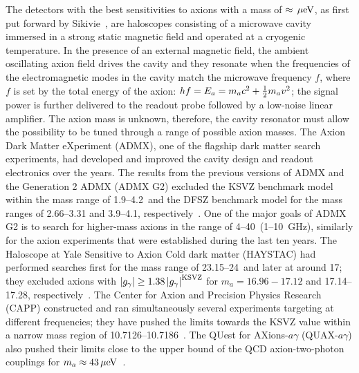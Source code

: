 The detectors with the best sensitivities to axions with a mass of 
$\approx \,\mu\text{e\hspace{-.08em}V}$, as first put forward by 
Sikivie~\cite{SikivieI,SikivieII},  
are haloscopes consisting of a microwave cavity immersed in a strong static 
magnetic field and operated at a cryogenic temperature. 
In the presence of an external magnetic field, the ambient oscillating axion 
field drives the cavity and they resonate when the frequencies of the 
electromagnetic 
modes in the cavity match the microwave frequency $f$, where $f$ is set by 
the total energy of the axion: $hf=E_a=m_a c^2 + \frac{1}{2}m_a v^2$; the 
signal power is further delivered %
to the readout probe followed by a low-noise linear amplifier. 
The axion mass is unknown, therefore, 
the cavity resonator must allow the possibility to be tuned through a range
of possible axion masses. The Axion Dark Matter eXperiment (ADMX), 
one of the flagship dark matter search experiments, had developed and 
improved the cavity design and readout electronics over the years. 
The results from the previous 
versions of ADMX and the Generation 2 ADMX (ADMX G2) excluded the KSVZ 
benchmark model within the mass range of %
1.9--4.2\muevcc\ and the DFSZ benchmark model for the mass ranges 
of 2.66--3.31 and 3.9--4.1\muevcc, 
respectively~\cite{ADMXI,ADMXII,ADMXIII,ADMXIV,ADMXV,ADMXVI,ADMXVII}. 
One of the major goals of ADMX G2 is to search for higher-mass axions in the range 
of 4--40\muevcc\ (1--10~GHz), similarly for the axion experiments that 
were established during the last ten years.  
The Haloscope at Yale Sensitive to Axion Cold dark matter 
(HAYSTAC) had performed searches first for the mass range of 
23.15--24\muevcc\ and later at around 17\muevcc; they excluded axions 
with $\left|g_{\gamma}\right|\geq 1.38 \left|g_{\gamma}\right|^\text{KSVZ}$ for $m_a=16.96-17.12$ and 
17.14--17.28\muevcc, respectively~\cite{HAYSTACI}. The Center 
for Axion and Precision Physics Research (CAPP) constructed 
and ran simultaneously several experiments targeting at 
different frequencies; they have pushed the limits towards the 
KSVZ value within a narrow mass region of 
10.7126--10.7186\muevcc~\cite{CAPPI}.
The QUest for AXions-$a\gamma$ (QUAX-$a\gamma$) also pushed their limits 
close to the upper bound of the QCD axion-two-photon couplings for 
$m_a\approx43\,\mu\text{e\hspace{-.08em}V}$~\cite{QUAX}.   


